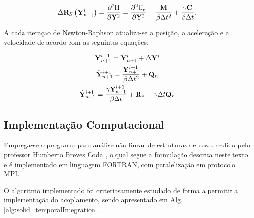 \documentclass[tese_patricia]{subfiles}
\begin{document}
\begin{gather}
\Delta\mathbf{R}_S\left(\mathbf{Y}_{n+1}^{i}\right) = \frac{\partial^{2}\Pi}{\partial\mathbf{Y}^{2}} = \frac{\partial^{2}\mathbb{U}_e}{\partial \mathbf{Y}^{2}} + \frac{\mathbf{M}}{\beta \Delta t^2} + \frac{\gamma \mathbf{C}}{\beta \Delta t}.
\end{gather}

A cada iteração de Newton-Raphson atualiza-se a posição, a aceleração e a velocidade de acordo com as seguintes equações:

\begin{gather}
\mathbf{Y}_{n+1}^{i+1} = \mathbf{Y}_{n+1}^{i} + \Delta\mathbf{Y}^{i} \label{UD1}\\
\ddot{\mathbf{Y}}_{n+1}^{i+1} = \frac{\mathbf{Y}_{n+1}^{i+1}}{\beta \Delta t^2} + \mathbf{Q}_n  \label{UD2} \\
\dot{\mathbf{Y}}_{n+1}^{i+1} = \frac{\gamma \mathbf{Y}_{n+1}^{i+1}}{\beta \Delta t} + \mathbf{R}_n - \gamma\Delta t \mathbf{Q}_n  \label{UD3}
\end{gather}


\subsection{Implementação Computacional}

Emprega-se o programa para análise não linear de estruturas de casca cedido pelo professor Humberto Breves Coda \cite{CodaP:2007,CodaP:2008}, o qual segue a formulação descrita neste texto e é implementado em linguagem FORTRAN, com paralelização em protocolo MPI.

O algoritmo implementado foi criteriosamente estudado de forma a permitir a implementação do acoplamento, sendo apresentado em Alg. \ref{alg:solid_temporalIntegration}.
\end{document}
